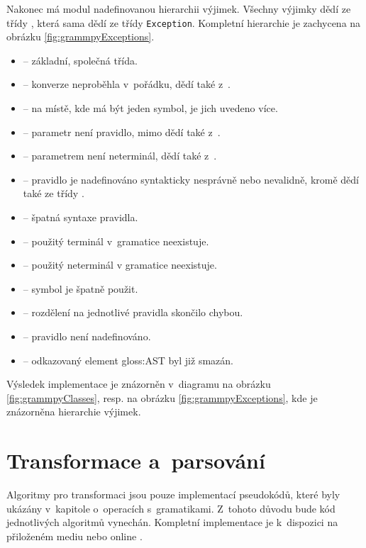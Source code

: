 		Nakonec má modul nadefinovanou hierarchii výjimek. Všechny výjimky dědí ze třídy , která sama dědí ze třídy \texttt{Exception}. Kompletní hierarchie je zachycena na obrázku \ref{fig:grammpyExceptions}.
		\begin{itemize}
			\item {} -- základní, společná třída.
			\item {} -- konverze neproběhla v~pořádku, dědí také z~.
			\item {} -- na místě, kde má být jeden symbol, je jich uvedeno více.
			\item {} -- parametr není pravidlo, mimo  dědí také z~.
			\item {} -- parametrem není neterminál, dědí také z~.
			\item {} -- pravidlo je nadefinováno syntakticky nesprávně nebo nevalidně, kromě  dědí také ze třídy .
			\item {} -- špatná syntaxe pravidla.
			\item {} -- použitý terminál v~gramatice neexistuje.
			\item {} -- použitý neterminál v gramatice neexistuje.
			\item {} --	\EpsS symbol je špatně použit.
			\item {} -- rozdělení na jednotlivé pravidla skončilo chybou.
			\item {} -- pravidlo není nadefinováno.
			\item {} -- odkazovaný element \gls{gloss:AST} byl již smazán.
		\end{itemize}
	
		Výsledek implementace je znázorněn v~diagramu na obrázku \ref{fig:grammpyClasses}, resp. na obrázku \ref{fig:grammpyExceptions}, kde je znázorněna hierarchie výjimek. 
		
	\section{Transformace a~parsování}
	
		Algoritmy pro transformaci jsou pouze implementací pseudokódů, které byly ukázány v~kapitole o~operacích s~gramatikami. Z~tohoto důvodu bude kód jednotlivých algoritmů vynechán. Kompletní implementace je k~dispozici na přiloženém mediu nebo online \cite{GrammpyProject}.
		
